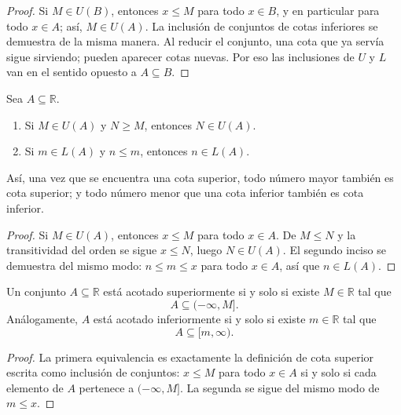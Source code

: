 \begin{proof}
Si $M\in U(B)$, entonces $x\leq M$ para todo $x\in B$, y en particular para todo $x\in A$; así, $M\in U(A)$. La inclusión de conjuntos de cotas inferiores se demuestra de la misma manera. Al reducir el conjunto, una cota que ya servía sigue sirviendo; pueden aparecer cotas nuevas. Por eso las inclusiones de $U$ y $L$ van en el sentido opuesto a $A\subseteq B$.
\end{proof}

\begin{samepage}
\begin{proposition}
\label{prop:extension-cotas}
Sea $A\subseteq\mathbb{R}$.
\begin{enumerate}
  \item Si $M\in U(A)$ y $N\geq M$, entonces $N\in U(A)$.
  \item Si $m\in L(A)$ y $n\leq m$, entonces $n\in L(A)$.
\end{enumerate}
Así, una vez que se encuentra una cota superior, todo número mayor también es cota superior; y todo número menor que una cota inferior también es cota inferior.
\end{proposition}
\end{samepage}

\begin{proof}
Si $M\in U(A)$, entonces $x\leq M$ para todo $x\in A$. De $M\leq N$ y la transitividad del orden se sigue $x\leq N$, luego $N\in U(A)$. El segundo inciso se demuestra del mismo modo: $n\leq m\leq x$ para todo $x\in A$, así que $n\in L(A)$.
\end{proof}

\begin{samepage}
\begin{proposition}
\label{prop:cotas-intervalos}
Un conjunto $A\subseteq\mathbb{R}$ está acotado superiormente si y solo si existe $M\in\mathbb{R}$ tal que
\[
 A\subseteq(-\infty,M].
\]
Análogamente, $A$ está acotado inferiormente si y solo si existe $m\in\mathbb{R}$ tal que
\[
 A\subseteq[m,\infty).
\]
\end{proposition}
\end{samepage}

\begin{proof}
La primera equivalencia es exactamente la definición de cota superior escrita como inclusión de conjuntos: $x\leq M$ para todo $x\in A$ si y solo si cada elemento de $A$ pertenece a $(-\infty,M]$. La segunda se sigue del mismo modo de $m\leq x$.
\end{proof}

